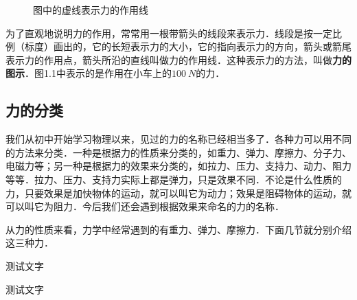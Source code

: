 \begin{Topic}
\begin{wrapfigure}[6]{r}{6cm}
    \vspace*{-1.5em}
    \centering
    \caption{图中的虚线表示力的作用线}
\end{wrapfigure}
为了直观地说明力的作用，常常用一根带箭头的线段来表示力．线段是按一定比
例（标度）画出的，它的长短表示力的大小，它的指向表示力的方向，箭头或箭尾表示力的作用点，箭头所沿的直线叫做力的作用线．这种表示力的方法，叫做\textbf{力的图示}．图1.1中表示的是作用在小车上的$\qty{100}{N}$的力．

\subsection{力的分类}

我们从初中开始学习物理以来，见过的力的名称已经相当多了．各种力可以用不同的方法来分类．一种是根据力的性质来分类的，如重力、弹力、摩擦力、分子力、电磁力等；另一种是根据力的效果来分类的，如拉力、压力、支持力、动力、阻力等等．拉力、压力、支持力实际上都是弹力，只是效果不同．不论是什么性质的力，只要效果是加快物体的运动，就可以叫它为动力；效果是阻碍物体的运动，就可以叫它为阻力．今后我们还会遇到根据效果来命名的力的名称．

从力的性质来看，力学中经常遇到的有重力、弹力、摩擦力．下面几节就分别介绍这三种力．


\begin{Example}
	测试文字
\end{Example}

\begin{Paracol}
\begin{Exercise}
\begin{QsNum}
	\item 测试文字
\end{QsNum}
\end{Exercise}
\end{Paracol}


\end{Topic}
